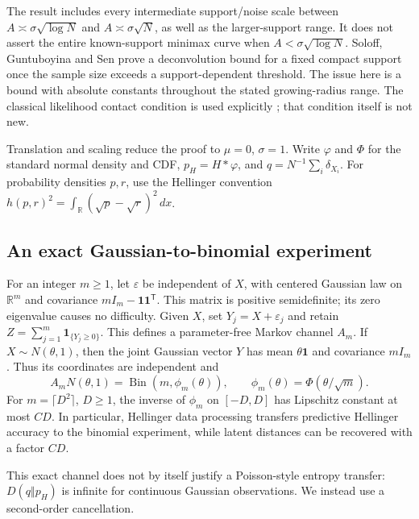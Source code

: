 \documentclass[11pt,a4paper]{article}
\theoremstyle{definition}
\theoremstyle{remark}
\numberwithin{equation}{section}
\begin{document}
The result includes every intermediate support/noise scale between
$A\asymp\sigma\sqrt{\log N}$ and $A\asymp\sigma\sqrt N$, as
well as the larger-support range.  It does not assert the entire
known-support minimax curve when $A<\sigma\sqrt{\log N}$.
Soloff, Guntuboyina and Sen \cite[Theorem 11]{p7:HO_SGSpreprint} prove a
deconvolution bound for a fixed compact support once the sample size
exceeds a support-dependent threshold.  The issue here is a bound
with absolute constants throughout the stated growing-radius range.
The classical likelihood contact condition is used explicitly
\cite[Proposition 1.1]{p5:GG_PS2025}; that condition itself is not new.

Translation and scaling reduce the proof to $\mu=0$, $\sigma=1$.
Write $\varphi$ and $\Phi$ for the standard normal density and CDF,
$p_H=H*\varphi$, and $q=N^{-1}\sum_i\delta_{X_i}$.
For probability densities $p,r$, use the Hellinger convention
$h(p,r)^2=\int_{\mathbb R}(\sqrt p-\sqrt r)^2\,dx$.

\subsection{An exact Gaussian-to-binomial experiment}

For an integer $m\ge1$, let $\varepsilon$ be independent of $X$,
with centered Gaussian law on $\mathbb R^m$ and covariance
$mI_m-\mathbf1\mathbf1^\mathsf T$.  This matrix is positive
semidefinite; its zero eigenvalue causes no difficulty.  Given $X$,
set $Y_j=X+\varepsilon_j$ and retain
$Z=\sum_{j=1}^m\mathbf1_{\{Y_j\ge0\}}$.  This defines a
parameter-free Markov channel $A_m$.  If $X\sim N(\theta,1)$,
then the joint Gaussian vector $Y$ has mean $\theta\mathbf1$ and
covariance $mI_m$.  Thus its coordinates are independent and
\begin{equation}\label{p5:gg:channel}
 A_mN(\theta,1)=\operatorname{Bin}(m,\phi_m(\theta)),
                 \qquad\phi_m(\theta)=\Phi(\theta/\sqrt m).
\end{equation}
For $m=\lceil D^2\rceil$, $D\ge1$, the inverse of $\phi_m$
on $[-D,D]$ has Lipschitz constant at most $CD$.  In particular,
Hellinger data processing transfers predictive Hellinger accuracy
to the binomial experiment, while latent distances can be recovered
with a factor $CD$.

This exact channel does not by itself justify a Poisson-style
entropy transfer: $D(q\Vert p_H)$ is infinite for continuous
Gaussian observations.  We instead use a second-order cancellation.
\end{document}
